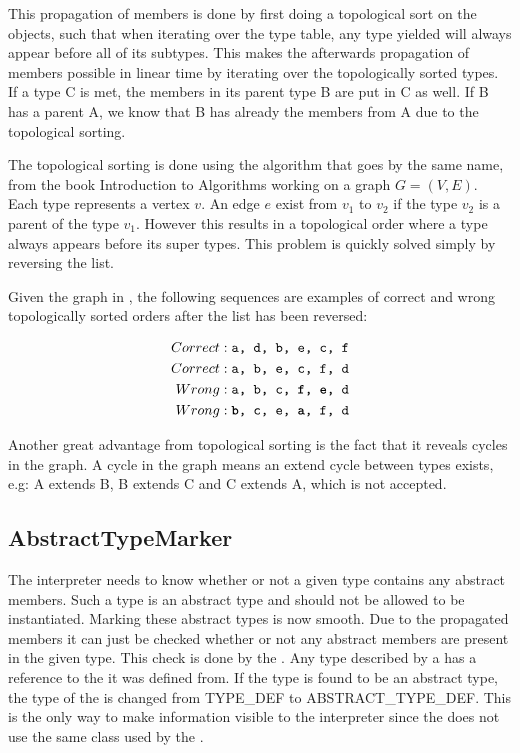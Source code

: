 This propagation of members is done by first doing a topological sort on the
 objects, such that when iterating over the type table,
any type yielded will always appear before all of its subtypes. This makes the
afterwards propagation of members possible in linear time by iterating over the
topologically sorted types. If a type C is met, the members in its parent type B
are put in C as well. If B has a parent A, we know that B has already the
members from A due to the topological sorting.

The topological sorting is done using the algorithm that goes by the same name, from the book Introduction
to Algorithms \cite[p. 612]{ad} working on a graph $G = (V, E)$. Each type
represents a vertex $v$. An edge $e$ exist from $v_1$ to $v_2$ if the type $v_2$
is a parent of the type $v_1$. However this results in a topological order where
a type always appears before its super types. This problem is quickly solved
simply by reversing the list.

Given the graph in , the following sequences are examples
of correct and wrong topologically sorted orders after the list has been reversed:

\begin{align*}
 Correct &: \texttt{a, d, b, e, c, f} \\
 Correct &: \texttt{a, b, e, c, f, d} \\
 Wrong &: \texttt{a, b, c, \textbf{f}, \textbf{e}, d} \\
 Wrong &: \texttt{\textbf{b}, c, e, \textbf{a}, f, d}
\end{align*}



Another great advantage from topological sorting is the fact that it reveals
cycles in the graph. A cycle in the graph means an extend cycle between types
exists, e.g: A extends B, B extends C and C extends A, which is not accepted.

\subsection{AbstractTypeMarker}
\label{sec:abstractTypeMarker}
The interpreter needs to know whether or not a given type contains any abstract
members. Such a type is an abstract type and should not be allowed to be
instantiated. Marking these abstract types is now smooth. Due to the propagated
members it can just be checked whether or not any abstract members are present in the
given type. This check is done by the . Any type
described by a  has a reference to the
 it was defined from. If the type is found to be an abstract
type, the type of the  is changed from TYPE\_DEF to
ABSTRACT\_TYPE\_DEF. This is the only way to make information visible to the
interpreter since the  does not use the same
 class used by the .

